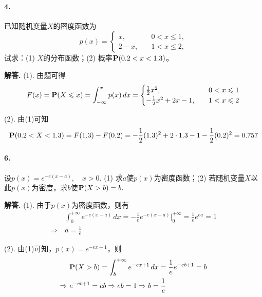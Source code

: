 \documentclass[12pt, a4paper, oneside]{ctexart}
\newenvironment{solution}{\par\noindent\textbf{解答. }}{\bigskip\par}
\begin{document}
\paragraph{4.}已知随机变量$X$的密度函数为
\begin{equation*}
    p(x)=\begin{cases}
        x,\quad&0<x\leqslant 1,\\
        2-x,\quad&1<x\leqslant 2,
    \end{cases}
\end{equation*}
试求：(1) $X$的分布函数；(2) 概率$\P(0.2<x<1.3)$。

\begin{solution}
    (1). 由题可得\begin{equation*}
        F(x) = \P(X\leqslant x) = \int_{-\infty}^xp(x)\,dx=\begin{cases}
            \frac{1}{2}x^2,\quad&0< x\leqslant 1\\
            -\frac{1}{2}x^2+2x-1,\quad&1<x\leqslant 2
        \end{cases}
    \end{equation*}

    (2). 由(1)可知 \begin{equation*}
        \P(0.2<X<1.3)=F(1.3)-F(0.2) = -\frac{1}{2}(1.3)^2+2\cdot 1.3-1-\frac{1}{2}(0.2)^2=0.757
    \end{equation*}
\end{solution}

\paragraph{6.}设$p(x) = e^{-e(x-a)},\quad x > 0.$ (1) 求$a$使$p(x)$为密度函数；(2) 若随机变量$X$以此$p(x)$为密度，求$b$使$\P(X>b) = b.$
\begin{solution}
    (1). 由于$p(x)$为密度函数，则有
    \begin{equation*}
        \begin{aligned}
            &\ \int_0^{+\infty}e^{-e(x-a)}\,dx = -\frac{1}{e}e^{-e(x-a)}\biggl|_0^{+\infty}=\frac{1}{e}e^{ea} = 1\\
            \Rightarrow&\ a = \frac{1}{e}
        \end{aligned}
    \end{equation*}

    (2). 由(1)可知，$p(x) = e^{-ex+1}$，则
    \begin{equation*}
        \begin{aligned}
            &\ \P(X>b) = \int_b^{+\infty}e^{-ex+1}\,dx = \frac{1}{e}e^{-eb+1} = b\\
            \Rightarrow&\ e^{-eb+1} = eb\Rightarrow eb = 1\Rightarrow b = \frac{1}{e}
        \end{aligned}
    \end{equation*}
\end{solution}
\end{document}
